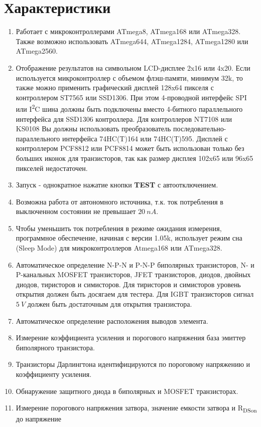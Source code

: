 \chapter{Характеристики}
\label{sec:features}
\begin{enumerate}
\item Работает с микроконтроллерами ATmega8, ATmega168 или ATmega328. Также возможно использовать ATmega644, ATmega1284, ATmega1280 или ATmega2560.
\item Отображение результатов на символьном LCD-дисплее 2x16 или 4x20.
Если используется микроконтроллер с объемом флэш-памяти, минимум 32k, то также можно применить графический дисплей 128x64
пикселя с контроллером ST7565 или SSD1306.
При этом 4-проводной интерфейс SPI или I\textsuperscript{2}C шина должны быть подключены вместо 4-битного параллельного интерфейса для
SSD1306 контроллера. Для контроллеров NT7108 или KS0108 Вы должны использовать преобразователь последовательно-параллельного
интерфейса 74HC(T)164 или 74HC(T)595.
Дисплей с контроллером PCF8812 или PCF8814 может быть использован только без больших иконок для транзисторов, так как размер дисплея 
102x65 или 96x65 пикселей недостаточен.
\item Запуск - однократное нажатие кнопки \textbf {TEST} с автоотключением.
\item Возможна работа от автономного источника, т.к. ток потребления в выключенном состоянии не превышает \(20~nA\).
\item Чтобы уменьшить ток потребления в режиме ожидания измерения, программное обеспечение, начиная с версии 1.05k, 
использует режим сна (Sleep Mode) для микроконтроллеров Atmega168 или ATmega328.
\item Автоматическое определение N-P-N и P-N-P биполярных транзисторов, N- и P-канальных MOSFET транзисторов, 
JFET транзисторов, диодов, двойных диодов, тиристоров и симисторов.
Для тиристоров и симисторов уровень открытия должен быть досягаем для тестера.
Для IGBT транзисторов сигнал \(5~V\) должен быть достаточным для открытия транзистора.  
\item Автоматическое определение расположения выводов элемента.
\item Измерение коэффициента усиления и порогового напряжения база эмиттер биполярного транзистора.
\item Транзисторы Дарлингтона идентифицируются по пороговому напряжению и коэффициенту усиления.
\item Обнаружение защитного диода в биполярных и MOSFET транзисторах.
\item Измерение порогового напряжения затвора, значение емкости затвора и R\textsubscript{DSon} до напряжение 

\end{enumerate}
